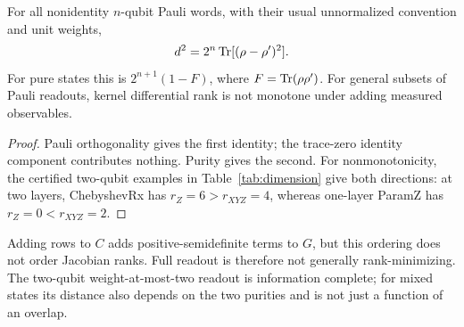 \begin{proposition}
\label{prop:IC}
For all nonidentity $n$-qubit Pauli words, with their usual
unnormalized convention and unit weights,
\begin{equation}
 d^2=2^n\operatorname{Tr}[(\rho-\rho')^2].
\end{equation}
For pure states this is $2^{n+1}(1-F)$, where $F=\operatorname{Tr}(\rho\rho')$.
For general subsets of Pauli readouts, kernel differential rank is
not monotone under adding measured observables.
\end{proposition}
\begin{proof}
Pauli orthogonality gives the first identity; the trace-zero identity
component contributes nothing. Purity gives the second. For
nonmonotonicity, the certified two-qubit examples in
Table~\ref{tab:dimension} give both directions: at two layers,
ChebyshevRx has $r_Z=6>r_{XYZ}=4$, whereas one-layer ParamZ has
$r_Z=0<r_{XYZ}=2$.
\end{proof}
Adding rows to $C$ adds positive-semidefinite terms to $G$, but this
ordering does not order Jacobian ranks. Full readout is therefore not
generally rank-minimizing. The two-qubit weight-at-most-two readout
is information complete; for mixed states its distance also depends
on the two purities and is not just a function of an overlap.
